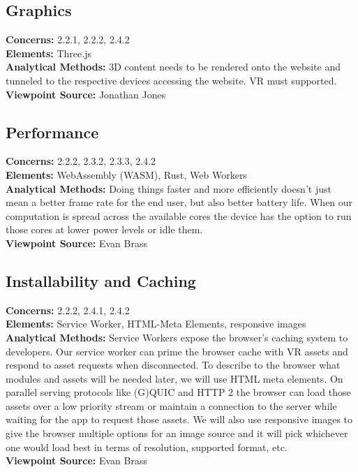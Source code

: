 \documentclass[onecolumn, draftclsnofoot,10pt, compsoc]{IEEEtran}
\begin{document}
\subsection{Graphics}
\textbf{Concerns:} 2.2.1, 2.2.2, 2.4.2\\
\textbf{Elements:} Three.js\\
\textbf{Analytical Methods:} 3D content needs to be rendered onto the website and tunneled to the respective devices accessing the website. VR must supported.\\
\textbf{Viewpoint Source:} Jonathan Jones

\subsection{Performance}
\textbf{Concerns:} 2.2.2, 2.3.2, 2.3.3, 2.4.2\\
\textbf{Elements:} WebAssembly (WASM), Rust, Web Workers\\
\textbf{Analytical Methods:} Doing things faster and more efficiently doesn't just mean a better frame rate for the end user, but also better battery life.  When our computation is spread across the available cores the device has the option to run those cores at lower power levels or idle them.\\
\textbf{Viewpoint Source:} Evan Brass

\subsection{Installability and Caching}
\textbf{Concerns:} 2.2.2, 2.4.1, 2.4.2\\
\textbf{Elements:} Service Worker, HTML-Meta Elements, responsive images\\
\textbf{Analytical Methods:} Service Workers expose the browser's caching system to developers. Our service worker can prime the browser cache with VR assets and respond to asset requests when disconnected.  To describe to the browser what modules and assets will be needed later, we will use HTML meta elements.  On parallel serving protocols like (G)QUIC and HTTP 2 the browser can load those assets over a low priority stream or maintain a connection to the server while waiting for the app to request those assets.  We will also use responsive images to give the browser multiple options for an image source and it will pick whichever one would load best in terms of resolution, supported format, etc.\\
\textbf{Viewpoint Source:} Evan Brass
\end{document}
